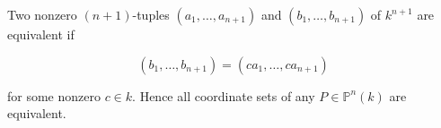 Two nonzero $(n+1)$-tuples $(a_1, \ldots, a_{n+1})$ and $(b_1, \ldots, b_{n+1})$ of $k^{n+1}$ are equivalent if

$$(b_1, \ldots, b_{n+1}) = (ca_1, \ldots, ca_{n+1})$$

for some nonzero $c \in k$. Hence all coordinate sets of any $P \in \mathbb{P}^n(k)$ are equivalent.
